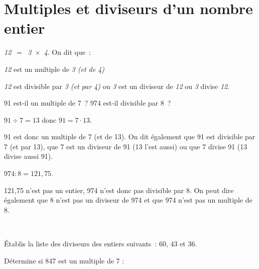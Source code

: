 \section{Multiples et diviseurs d'un nombre entier} 


\begin{aconnaitre}
\emph{12 $=$ 3 $\times$ 4}. On dit que :

\textcolor{C2}{\emph{12} est un multiple de \emph{3 (et de 4)}}

\textcolor{A1}{\emph{12} est divisible par \emph{3 (et par 4)}} ou \textcolor{J1}{\emph{3} est un diviseur de \emph{12}} ou \textcolor{H1}{\emph{3} divise \emph{12}}.
\end{aconnaitre}




\begin{methode*1}

\begin{exemple*1}
91 est-il un multiple de 7 ? 974 est-il divisible par 8 ? \\[1em]
\begin{minipage}[t]{0.46\linewidth}
$91 \div 7 = 13$ donc $91 = 7 \cdot 13$.

91 est donc un multiple de 7 (et de 13). On dit également que 91 est divisible par 7 (et par 13), que 7 est un diviseur de 91 (13 l'est aussi) ou que 7 divise 91 (13 divise aussi 91).
 \end{minipage} \hfill%
 \begin{minipage}[t]{0.46\linewidth}
 $974 : 8 = 121,75$.
 
121,75 n'est pas un entier, 974 n'est donc pas divisible par 8. On peut dire également que 8 n'est pas un diviseur de 974 et que 974 n'est pas un multiple de 8.
\end{minipage} \\

\end{exemple*1}

\exercice 
Établis la liste des diviseurs des entiers suivants : 60, 43 et 36.

\vspace{5em}





\exercice 
Détermine si 847 est un multiple de 7 :



\end{methode*1}

